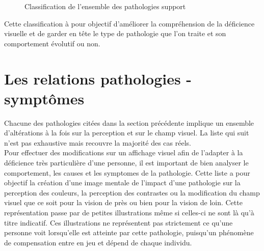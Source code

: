 \documentclass[french,a4paper]{report}
\begin{document}
{\begin{figure}[H]
\caption{Classification de l'ensemble des pathologies support}
\end{figure}
Cette classification à pour objectif d'améliorer la compréhension de la déficience visuelle et de garder en tête le type de pathologie que l'on traite et son comportement évolutif ou non.
\section{Les relations pathologies - symptômes}
Chacune des pathologies citées dans la section précédente implique un ensemble d'altérations à la fois sur la perception et sur le champ visuel. La liste qui suit n'est pas exhaustive mais recouvre la majorité des cas réels.\\
Pour effectuer des modifications sur un affichage visuel afin de l'adapter à la déficience très particulière d'une personne, il est important de bien analyser le comportement, les causes et les \glspl{symptome} de la pathologie. Cette liste a pour objectif la création d'une image mentale de l'impact d'une pathologie sur la perception des couleurs, la perception des contrastes ou la modification du champ visuel que ce soit pour la vision de près ou bien pour la vision de loin. Cette représentation passe par de petites illustrations même si celles-ci ne sont là qu'à titre indicatif. Ces illustrations ne représentent pas strictement ce qu'une personne voit lorsqu'elle est atteinte par cette pathologie, puisqu'un phénomène de compensation entre en jeu et dépend de chaque individu.\\
\newline
}
\end{document}
